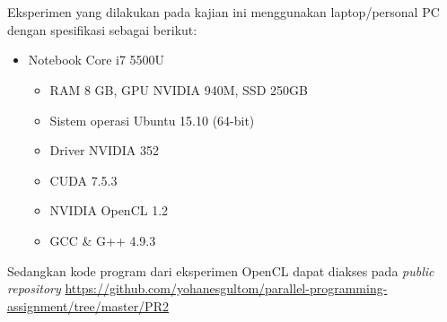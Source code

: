 \chapter{\lingkungan}

Eksperimen yang dilakukan pada kajian ini menggunakan laptop/personal PC dengan spesifikasi sebagai berikut:

\begin{itemize}
	\item Notebook Core i7 5500U
	\begin{itemize}
		\item RAM 8 GB, GPU NVIDIA 940M, SSD 250GB
		\item Sistem operasi Ubuntu 15.10 (64-bit)
		\item Driver NVIDIA 352
		\item CUDA 7.5.3
		\item NVIDIA OpenCL 1.2
		\item GCC \& G++ 4.9.3
	\end{itemize}
\end{itemize}

Sedangkan kode program dari eksperimen OpenCL dapat diakses pada \textit{public repository} \url{https://github.com/yohanesgultom/parallel-programming-assignment/tree/master/PR2}
